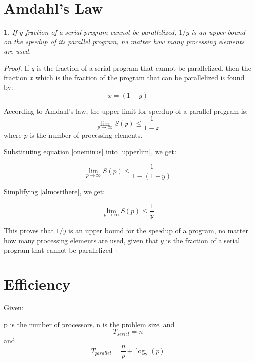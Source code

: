 \documentclass[letterpaper]{article}
\newtheorem{thm}{}
\begin{document}
\section{Amdahl's Law}
\label{sec:orgbbeb046}

\begin{thm}
    If \(y\) fraction of a serial program cannot be parallelized, \(1/y\) is an upper bound on the speedup of its parallel program, no matter how many processing elements are used.
\end{thm}

\begin{proof}
If \(y\) is the fraction of a serial program that cannot be parallelized, then the fraction \(x\) which is the fraction of the program that can be parallelized is found by:
\begin{equation}\label{oneminus}
x =  (1-y)
\end{equation}

According to Amdahl's law, the upper limit for speedup of a parallel program is:
\begin{equation}\label{upperlim}
\lim_{p \to \infty} S(p) \leq \frac{1}{1-x}
\end{equation}
where \(p\) is the number of processing elements.

Substituting equation \ref{oneminus} into \ref{upperlim}, we get:

\begin{equation}\label{almostthere}
\lim_{p \to \infty} S(p) \leq \frac{1}{1-(1-y)}
\end{equation}

Simplifying \ref{almostthere}, we get:

\begin{equation}
\lim_{p \to \infty} S(p) \leq \frac{1}{y}
\end{equation}

This proves that \(1/y\) is an upper bound for the speedup of a program, no matter how many processing elements are used, given that \(y\) is the fraction of a serial program that cannot be parallelized
\end{proof}

\section{Efficiency}
\label{sec:orgc49cbae}
Given:

p is the number of processors, n is the problem size, and
\[T_{serial} = n\]
and
\[T_{parallel} = \frac{n}{p} + \log_2 (p)\]
\end{document}
